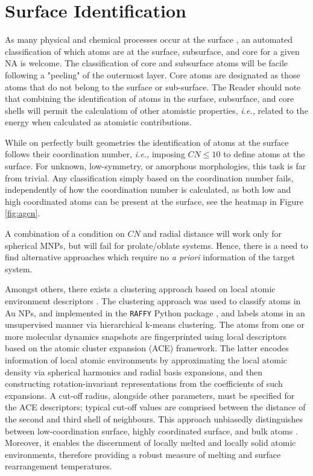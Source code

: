 \section{Surface Identification}

As many physical and chemical processes occur at the surface \cite{Greely2009,TRossi2020,DiPaola2016}, an automated classification of which atoms are at the surface, subsurface, and core for a given NA is welcome. 
The classification of core and subsurface atoms will be facile following a "peeling" of the outermost layer.
Core atoms are designated as those atoms that do not belong to the surface or sub-surface.
The Reader should note that combining the identification of atoms in the surface, subsurface, and core shells will permit the calculatiom of other atomistic properties, \textit{i.e.,} related to the energy when calculated as atomistic contributions.
%

While on perfectly built geometries the identification of atoms at the surface follows their coordination number, \textit{i.e.,} imposing $CN\leq 10$ to define atoms at the surface. For unknown, low-symmetry, or amorphous morphologies, this task is far from trivial.
Any classification simply based on the coordination number fails, independently of how the coordination number is calculated, as both low and high coordinated atoms can be present at the surface, see the heatmap in  Figure \ref{fig:agcn}.

A combination of a condition on $CN$ and radial distance will work only for spherical MNPs, but will fail for prolate/oblate systems. 
Hence, there is a need to find alternative approaches which require no \textit{a priori} information of the target system.
%

Amongst others, there exists a clustering approach based on local atomic environment descriptors \cite{Zeni2021}. The clustering approach was used to classify atoms in Au NPs, and implemented in the \texttt{RAFFY} Python package \cite{zeni2021compact}, and labels atoms in an unsupervised manner via hierarchical k-means clustering.
%
The atoms from one or more molecular dynamics snapshots are fingerprinted using local descriptors based on the atomic cluster expansion \cite{drautz2019} (ACE) framework. 
%
The latter encodes information of local atomic environments by approximating the local atomic density via spherical harmonics and radial basis expansions, and then constructing rotation-invariant representations from the coefficients of such expansions.
%
A cut-off radius, alongside other parameters, must be specified for the ACE descriptors; typical cut-off values are comprised between the distance of the second and third shell of neighbours.
%
This approach unbiasedly distinguishes between low-coordination surface, highly coordinated surface, and bulk atoms \cite{Zeni2021}.  
%
Moreover, it enables the discernment of locally melted and locally solid atomic environments, therefore providing a robust measure of melting and surface rearrangement temperatures.

